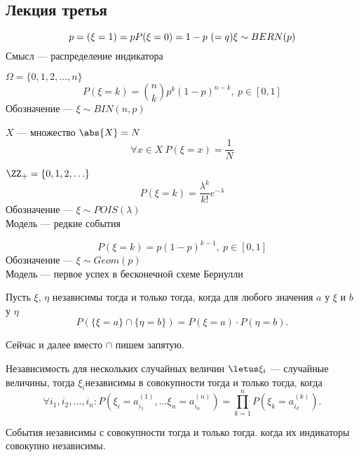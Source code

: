\subsection{Лекция третья}

\begin{definition}
    \[p={(\xi=1)=p} \\
    P(\xi = 0)=1-p\ (=q)\\
    \xi \sim BERN(p)\]
    Смысл --- распределение индикатора
\end{definition}

\begin{definition}
    $\Omega = \{0, 1, 2, \ldots, n\}$
    \[P(\xi = k) = \binom{n}{k}p^k(1-p)^{n-k},\ p \in [0, 1]\]
    Обозначение --- $\xi \sim BIN(n, p)$
\end{definition}

\begin{definition}
    $X$ --- множество $\abs{X} = N$
    \[\forall x \in X \ P(\xi = x) = \frac{1}{N}\] 
\end{definition}


\begin{definition}
    $\ZZ_+ = \{0, 1, 2, \ldots \}$
    \[P(\xi = k) = \frac{\lambda^k}{k!}e^{-\lambda}\]
    Обозначение --- $\xi \sim POIS(\lambda)$\\
    Модель --- редкие события
\end{definition}

\begin{definition}
    \[P(\xi = k) = p(1-p)^{k-1},\ p \in [0, 1]\]
    Обозначение --- $\xi \sim Geom(p)$\\
    Модель --- первое успех в бесконечной схеме Бернулли 
\end{definition}

\begin{definition}
    Пусть $\xi$, $\eta$ независимы тогда и только тогда, когда для любого значения $a$ у $\xi$ и $b$ у $\eta$ 
    \[P(\{\xi=a\} \cap \{\eta=b\}) = P(\xi=a) \cdot P(\eta=b).\]

    \begin{remark}
        Сейчас и далее вместо $\cap$ пишем запятую.
    \end{remark}
    
    Независимость для нескольких случайных величин 
    $\letus \xi_i$ --- случайные величины, тогда $\xi_i$независимы в совокупности тогда и только тогда, когда 
    \[\forall i_1, i_2, \ldots, i_n : P(\xi_i=a_{i_1}^{(1)}, \ldots \xi_n=a_{i_n}^{(n)}) = \prod_{k=1}^n P(\xi_k=a_{i_k}^{(k)}).\]

    События независимы с совокупности тогда и только тогда. когда их индикаторы совокупно независимы.
\end{definition}

